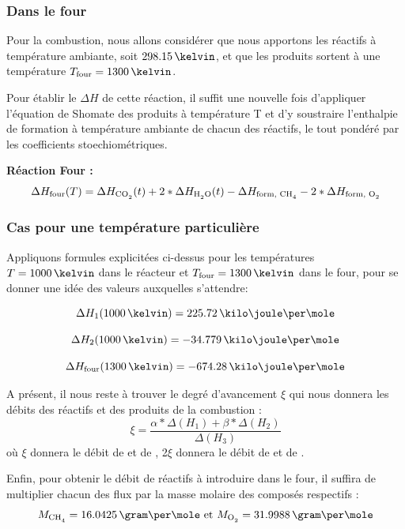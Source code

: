 \documentclass[a4paper,12pt]{article}
\begin{document}
\subsubsection{Dans le four}

Pour la combustion, nous allons considérer que nous apportons les réactifs
à température ambiante, soit $298.15\,\kelvin$,
et que les produits sortent à une température $T\ind{four}=1300\,\kelvin$.

Pour établir le $\Delta H$ de cette réaction,
il suffit une nouvelle fois d’appliquer l’équation de Shomate des produits à température T
et d’y soustraire l’enthalpie de formation à température ambiante de chacun des réactifs,
le tout pondéré par les coefficients stoechiométriques.


\textbf{Réaction Four :}  
\begin{equation*}
    \Delta H\ind{four}(T) =  \Delta H_{\ce{CO2}} (t)
    + 2*\Delta H_{\ce{H2O}} (t)
    - \Delta H\ind{form, \ce{CH4}}
    - 2*\Delta H\ind{form, \ce{O2}}
\end{equation*}


\subsubsection{Cas pour une température particulière}


Appliquons formules explicitées ci-dessus pour les températures $T=1000\,\kelvin$
dans le réacteur et $T\ind{four} = 1300\,\kelvin$ dans le four,
pour se donner une idée des valeurs auxquelles s'attendre:

$$\Delta H_1 (1000\,\kelvin) = 225.72\,\kilo\joule\per\mole$$

$$\Delta H_2 (1000\,\kelvin) = -34.779\,\kilo\joule\per\mole$$

$$\Delta H\ind{four}  (1300\,\kelvin) = -674.28\,\kilo\joule\per\mole$$


A présent, il nous reste à trouver le degré d'avancement $\xi$
qui nous donnera les débits des réactifs et des produits de la combustion :
$$\xi = \frac{\alpha * \Delta (H_1) + \beta * \Delta (H_2)}{\Delta (H_3)}$$
où $\xi$ donnera le débit de  et de ,
2$\xi$ donnera le débit de  et de .


Enfin, pour obtenir le débit de réactifs à introduire dans le four,
il suffira de multiplier chacun des flux par la masse molaire des composés respectifs :
\begin{equation*}
    M_{\ce{CH4}}=16.0425\,\gram\per\mole \mbox{ et } M_{\ce{O2}}=31.9988\,\gram\per\mole
\end{equation*}
\end{document}
